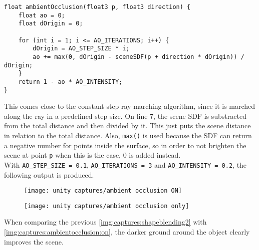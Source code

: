 \begin{lstlisting}[language=HLSL, caption=Implementation of ambient occlusion., label=lst:shader:ambientocclusion]
float ambientOcclusion(float3 p, float3 direction) {
    float ao = 0;
    float dOrigin = 0;

    for (int i = 1; i <= AO_ITERATIONS; i++) {
        dOrigin = AO_STEP_SIZE * i;
        ao += max(0, dOrigin - sceneSDF(p + direction * dOrigin)) / dOrigin;
    }
    return 1 - ao * AO_INTENSITY;
}
\end{lstlisting}

\noindent
This comes close to the constant step ray marching algorithm, since it is marched along the ray in a predefined step size.
On line 7, the scene SDF is substracted from the total distance and then divided by it. This just puts the scene distance in relation to the total distance.
Also, \lstinline[language=HLSL]{max()} is used because the SDF can return a negative number for points inside the surface, so in order to not brighten the scene at point \lstinline[language=HLSL]{p} when this is the case, 0 is added instead.
\\
With \lstinline[language=HLSL]{AO_STEP_SIZE = 0.1}, \lstinline[language=HLSL]{AO_ITERATIONS = 3} and \lstinline[language=HLSL]{AO_INTENSITY = 0.2}, the following output is produced.

\begin{figure}[H]
    \centering
        \begin{minipage}{0.47\linewidth}
            \texttt{[image: unity captures/ambient occlusion ON]}
            \label{img:captures:ambientocclusion:on}
        \end{minipage}
    \hfill
        \begin{minipage}{0.47\linewidth}
            \texttt{[image: unity captures/ambient occlusion only]}
            \label{img:captures:ambientocclusion:only}
        \end{minipage}
\end{figure}

\noindent
When comparing the previous \autoref{img:captures:shapeblending2} with \autoref{img:captures:ambientocclusion:on}, the darker ground around the object clearly improves the scene.